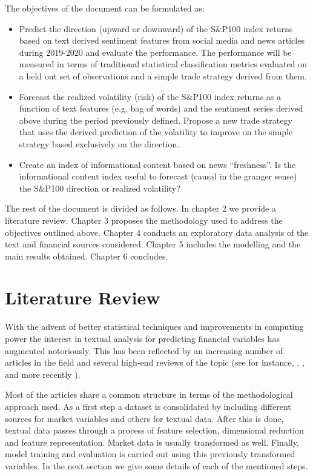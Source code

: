 \documentclass[a4paper, 12pt]{report}
\begin{document}
    The objectives of the document can be formulated as:
    
    \begin{itemize}
        \item Predict the direction (upward or downward) of the S$\&$P100 index returns based on text derived sentiment features from social media and news articles during $2019$-$2020$ and evaluate the performance. The performance will be measured in terms of traditional statistical classification metrics evaluated on a held out set of observations and a simple trade strategy derived from them. 
        \item Forecast the realized volatility (risk) of the S$\&$P100 index returns as a function of text features (e.g. bag of words) and the sentiment series derived above during the period previously defined. Propose a new trade strategy that uses the derived prediction of the volatility to improve on the simple strategy based exclusively on the direction.
        \item Create an index of informational content based on news “freshness”. Is the informational content index useful to forecast (causal in the granger sense) the S$\&$P100 direction or realized volatility? 
    \end{itemize}
    
    The rest of the document is divided as follows. In chapter 2 we provide a literature review. Chapter 3 proposes the methodology used to address the objectives outlined above. Chapter 4 conducts an exploratory data analysis of the text and financial sources considered. Chapter 5 includes the modelling and the main results obtained. Chapter 6 concludes.  

    \chapter{Literature Review}
    
    With the advent of better statistical techniques and improvements in computing power the interest in textual analysis for predicting financial variables has augmented notoriously. This has been reflected by an increasing number of articles in the field and several high-end reviews of the topic (see for instance, \textcite{Kearney:2014}, \textcite{Nassirtoussi:2014},
    \textcite{Xing:2018} and more recently \textcite{Loughran:2020}).
    
    Most of the articles share a common structure in terms of the methodological approach used. As a first step a dataset is consolidated by including different sources for market variables and others for textual data. After this is done, textual data passes through a process of feature selection, dimensional reduction and feature representation. Market data is usually transformed as well. Finally, model training and evaluation is carried out using this previously transformed variables. In the next section we give some details of each of the mentioned steps. 
\end{document}
